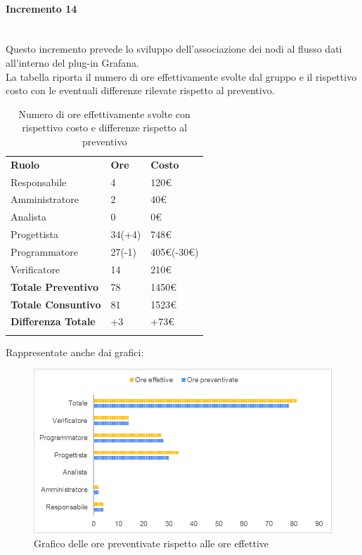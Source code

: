 \paragraph{Incremento 14} \mbox{} \\
Questo incremento prevede lo sviluppo dell'associazione dei nodi al flusso dati all'interno del plug-in Grafana\glo. \\ 
La tabella riporta il numero di ore effettivamente svolte dal gruppo e il rispettivo costo con le eventuali differenze rilevate rispetto al preventivo.
\begin{longtable} {							
		>{}p{40mm}  
		>{}p{20mm}	
		>{}p{28mm}			
	}			
	\rowcolor{gray!50}
	
	\textbf{Ruolo}            & \textbf{Ore} & \textbf{Costo}       \TBstrut \\
	Responsabile              & 4            & 120\euro             \TBstrut \\
	Amministratore            & 2            & 40\euro              \TBstrut \\
	Analista                  & 0            & 0\euro               \TBstrut \\
	Progettista               & 34(+4)       & 748\euro             \TBstrut \\
	Programmatore             & 27(-1)       & 405\euro(-30\euro)   \TBstrut \\
	Verificatore              & 14           & 210\euro             \TBstrut \\
	\textbf{Totale Preventivo}& 78           & 1450\euro            \TBstrut \\	
	\textbf{Totale Consuntivo}& 81           & 1523\euro            \TBstrut \\	
	\textbf{Differenza Totale}& +3           & +73\euro             \TBstrut \\
	\rowcolor{white}
	\caption{Numero di ore effettivamente svolte con rispettivo costo e differenze rispetto al preventivo}	
\end{longtable}

Rappresentate anche dai grafici:
\begin{figure} [H]
	\includegraphics[width=\linewidth]{./img/Grafici/39.png}
	\caption{Grafico delle ore preventivate rispetto alle ore effettive}
\end{figure}


